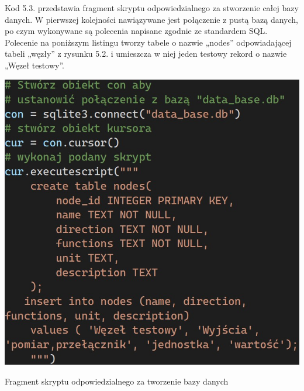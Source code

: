 \documentclass[12pt, twoside, openany]{mwrep}
\begin{document}
Kod 5.3. przedstawia fragment skryptu odpowiedzialnego za stworzenie całej bazy danych. W pierwszej kolejności nawiązywane jest połączenie z pustą bazą danych, po czym wykonywane są polecenia napisane zgodnie ze standardem SQL. Polecenie na poniższym listingu tworzy tabele o nazwie „nodes” odpowiadającej tabeli „węzły” z rysunku 5.2. i umieszcza w niej jeden testowy rekord o nazwie „Węzeł testowy”.
\par

\begin{algorithm}[H]
\centering
\includegraphics[scale=0.7]{kod_migracja}
\caption{Fragment skryptu odpowiedzialnego za tworzenie bazy danych}
\end{algorithm}

\end{document}
